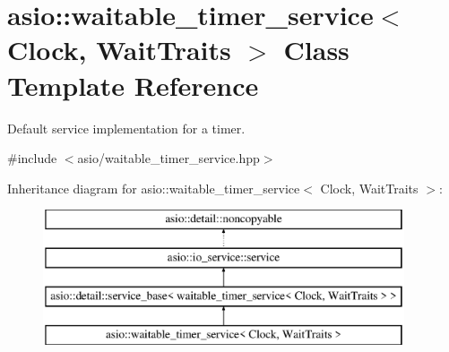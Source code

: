 \hypertarget{classasio_1_1waitable__timer__service}{}\section{asio\+:\+:waitable\+\_\+timer\+\_\+service$<$ Clock, Wait\+Traits $>$ Class Template Reference}
\label{classasio_1_1waitable__timer__service}


Default service implementation for a timer.  




{\ttfamily \#include $<$asio/waitable\+\_\+timer\+\_\+service.\+hpp$>$}

Inheritance diagram for asio\+:\+:waitable\+\_\+timer\+\_\+service$<$ Clock, Wait\+Traits $>$\+:\begin{figure}[H]
\begin{center}
\leavevmode
\includegraphics[height=4.000000cm]{classasio_1_1waitable__timer__service}
\end{center}
\end{figure}
